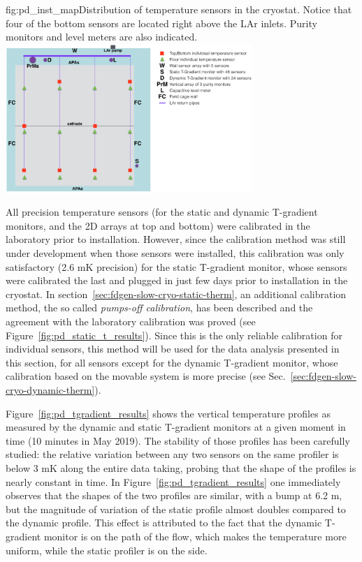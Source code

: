 \begin{dunefigure}{fig:pd_inst_map}{Distribution of temperature sensors in the  cryostat. Notice that four of the bottom sensors are located right above the LAr inlets. Purity monitors and level meters are also indicated. }
  \includegraphics[width=0.7\textwidth]{graphics/cisc_pdsp_instrumentation.png}%
\end{dunefigure}


All precision temperature sensors (for the static and dynamic T-gradient monitors,  and the 2D arrays at top and bottom) were calibrated in the laboratory prior to installation. However, since the calibration method was still under development when those sensors 
were installed, this calibration was only satisfactory (2.6 mK precision) for the static T-gradient monitor, whose sensors were calibrated the last and  plugged in just few days prior to installation in the cryostat. In section~\ref{sec:fdgen-slow-cryo-static-therm}, an additional calibration method, the so called {\it pumps-off calibration}, has been described and the agreement with the laboratory calibration was proved (see Figure~\ref{fig:pd_static_t_results}). Since this is the only reliable calibration for individual sensors, this method will be used for the data analysis presented in this section, for all sensors except for the dynamic T-gradient monitor, whose calibration based on the movable system is more precise (see Sec.~\ref{sec:fdgen-slow-cryo-dynamic-therm}). 


Figure~\ref{fig:pd_tgradient_results} shows the vertical temperature profiles as measured by the dynamic and static T-gradient monitors at a given moment in time (10 minutes in May 2019). The stability of those profiles has been carefully studied: the relative variation between any two sensors on the same profiler is below 3 mK along the entire data taking, probing that the shape of the profiles is nearly constant in time. In Figure~\ref{fig:pd_tgradient_results} one immediately observes that the shapes of the two profiles are similar, with a bump at 6.2 m, but the magnitude of %
variation of the static profile almost doubles %
compared to the dynamic profile. This effect is attributed to the fact that the dynamic T-gradient monitor is on the path of the \lar flow, which makes the temperature more uniform, while the static profiler is on the side.  

